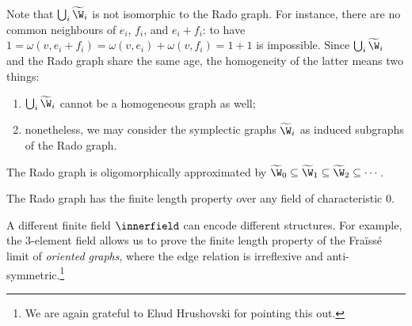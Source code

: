 Note that $\bigcup_{i} \widetilde \W_i$ is not isomorphic to the Rado graph.
For instance, there are no common neighbours of $e_i$, $f_i$, and $e_i + f_i$:
to have $1 = \omega(v, e_i + f_i) = \omega(v, e_i) + \omega(v, f_i) = 1 + 1$ is impossible.
Since $\bigcup_{i} \widetilde \W_i$ and the Rado graph share the same age, the homogeneity of the latter means two things:
\begin{enumerate}
    \item $\bigcup_{i} \widetilde \W_i$ cannot be a homogeneous graph as well;
    \item nonetheless, we may consider the symplectic graphs $\widetilde \W_i$ as induced subgraphs of the Rado graph.
\end{enumerate}

\begin{theorem} \label{thm:appendix-rado-oligo-approx}
    The Rado graph is oligomorphically approximated by $\widetilde \W_0 \subseteq \widetilde \W_1 \subseteq \widetilde \W_2 \subseteq \cdots$.
\end{theorem}

\begin{corollary}
    The Rado graph has the finite length property over any field of characteristic $0$.
\end{corollary}

A different finite field $\innerfield$ can encode different structures.
For example, the 3-element field allows us to prove the finite length property of the Fraïssé limit of \emph{oriented graphs}, where the edge relation is irreflexive and anti-symmetric.\footnote{We are again grateful to Ehud Hrushovski for pointing this out.}